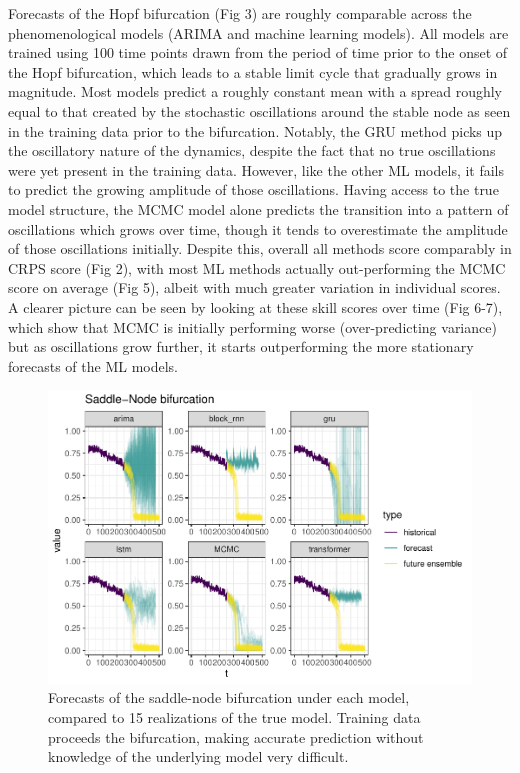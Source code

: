 \documentclass{article}
\begin{document}
Forecasts of the Hopf bifurcation (Fig 3) are roughly comparable across
the phenomenological models (ARIMA and machine learning models). All
models are trained using 100 time points drawn from the period of time
prior to the onset of the Hopf bifurcation, which leads to a stable
limit cycle that gradually grows in magnitude. Most models predict a
roughly constant mean with a spread roughly equal to that created by the
stochastic oscillations around the stable node as seen in the training
data prior to the bifurcation. Notably, the GRU method picks up the
oscillatory nature of the dynamics, despite the fact that no true
oscillations were yet present in the training data. However, like the
other ML models, it fails to predict the growing amplitude of those
oscillations. Having access to the true model structure, the MCMC model
alone predicts the transition into a pattern of oscillations which grows
over time, though it tends to overestimate the amplitude of those
oscillations initially. Despite this, overall all methods score
comparably in CRPS score (Fig 2), with most ML methods actually
out-performing the MCMC score on average (Fig 5), albeit with much
greater variation in individual scores. A clearer picture can be seen by
looking at these skill scores over time (Fig 6-7), which show that MCMC
is initially performing worse (over-predicting variance) but as
oscillations grow further, it starts outperforming the more stationary
forecasts of the ML models.

\begin{figure}
\centering
\includegraphics{manuscript_files/figure-latex/figure4-1.pdf}
\caption{Forecasts of the saddle-node bifurcation under each model,
compared to 15 realizations of the true model. Training data proceeds
the bifurcation, making accurate prediction without knowledge of the
underlying model very difficult.}
\end{figure}
\end{document}
